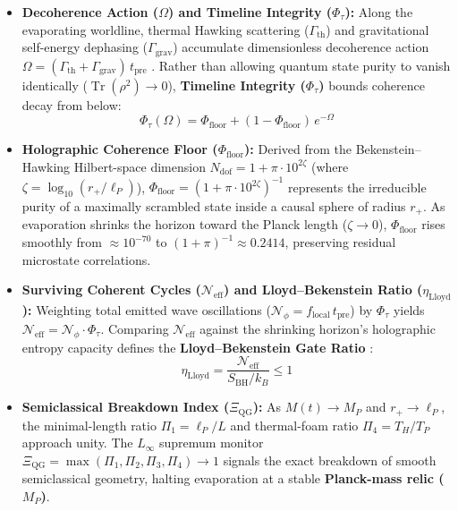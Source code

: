 \documentclass[11pt,a4paper]{article}
\begin{document}
\begin{itemize}
\item \textbf{Decoherence Action ($\Omega$) and Timeline Integrity ($\Phi_\tau$):} Along the evaporating worldline, thermal Hawking scattering ($\Gamma_{\text{th}}$) and gravitational self-energy dephasing ($\Gamma_{\text{grav}}$) accumulate dimensionless decoherence action $\Omega = (\Gamma_{\text{th}} + \Gamma_{\text{grav}})\,t_{\text{pre}}$ \cite{GKS1976,Lindblad1976}. Rather than allowing quantum state purity to vanish identically ($\operatorname{Tr}(\rho^2) \to 0$), \textbf{Timeline Integrity ($\Phi_\tau$)} bounds coherence decay from below:
\begin{equation}
\Phi_\tau(\Omega) = \Phi_{\text{floor}} + (1 - \Phi_{\text{floor}})\,e^{-\Omega}
\end{equation}

\item \textbf{Holographic Coherence Floor ($\Phi_{\text{floor}}$):} Derived from the Bekenstein--Hawking Hilbert-space dimension $N_{\text{dof}} = 1 + \pi \cdot 10^{2\zeta}$ (where $\zeta = \log_{10}(r_+ / \ell_P)$), $\Phi_{\text{floor}} = (1 + \pi \cdot 10^{2\zeta})^{-1}$ represents the irreducible purity of a maximally scrambled state inside a causal sphere of radius $r_+$. As evaporation shrinks the horizon toward the Planck length ($\zeta \to 0$), $\Phi_{\text{floor}}$ rises smoothly from $\approx 10^{-70}$ to $(1 + \pi)^{-1} \approx 0.2414$, preserving residual microstate correlations.

\item \textbf{Surviving Coherent Cycles ($\mathcal{N}_{\text{eff}}$) and Lloyd--Bekenstein Ratio ($\eta_{\text{Lloyd}}$):} Weighting total emitted wave oscillations ($\mathcal{N}_\phi = f_{\text{local}}\,t_{\text{pre}}$) by $\Phi_\tau$ yields $\mathcal{N}_{\text{eff}} = \mathcal{N}_\phi \cdot \Phi_\tau$. Comparing $\mathcal{N}_{\text{eff}}$ against the shrinking horizon's holographic entropy capacity defines the \textbf{Lloyd--Bekenstein Gate Ratio} \cite{ML1998,Lloyd2000}:
\begin{equation}
\eta_{\text{Lloyd}} = \frac{\mathcal{N}_{\text{eff}}}{S_{\text{BH}} / k_B} \le 1
\end{equation}

\item \textbf{Semiclassical Breakdown Index ($\Xi_{\text{QG}}$):} As $M(t) \to M_P$ and $r_+ \to \ell_P$, the minimal-length ratio $\Pi_1 = \ell_P / L$ and thermal-foam ratio $\Pi_4 = T_H / T_P$ approach unity. The $L_\infty$ supremum monitor $\Xi_{\text{QG}} = \max(\Pi_1, \Pi_2, \Pi_3, \Pi_4) \to 1$ signals the exact breakdown of smooth semiclassical geometry, halting evaporation at a stable \textbf{Planck-mass relic ($M_P$)}.
\end{itemize}
\end{document}
